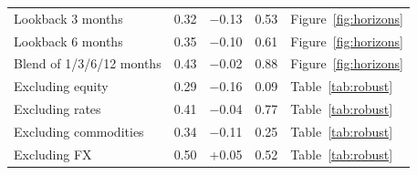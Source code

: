 \begin{tabular}{lrrrl}
Lookback 3 months & 0.32 & $-$0.13 & 0.53 & Figure~\ref{fig:horizons} \\
Lookback 6 months & 0.35 & $-$0.10 & 0.61 & Figure~\ref{fig:horizons} \\
Blend of 1/3/6/12 months & 0.43 & $-$0.02 & 0.88 & Figure~\ref{fig:horizons} \\
Excluding equity & 0.29 & $-$0.16 & 0.09 & Table~\ref{tab:robust} \\
Excluding rates & 0.41 & $-$0.04 & 0.77 & Table~\ref{tab:robust} \\
Excluding commodities & 0.34 & $-$0.11 & 0.25 & Table~\ref{tab:robust} \\
Excluding FX & 0.50 & +0.05 & 0.52 & Table~\ref{tab:robust} \\
\bottomrule
\end{tabular}
